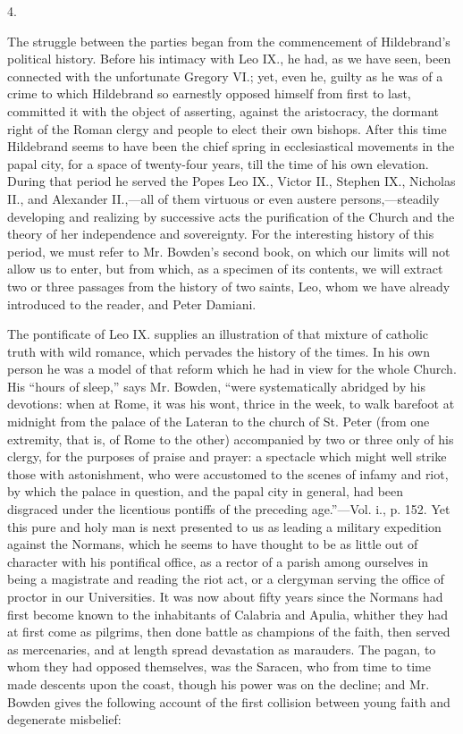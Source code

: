 4.

The struggle between the parties began from the
commencement of Hildebrand's political history. Before his intimacy
with Leo IX., he had, as we have seen, been connected with the
unfortunate Gregory VI.; yet, even he, guilty as he was of a crime to
which Hildebrand so earnestly opposed himself from first to last,
committed it with the object of asserting, against the aristocracy,
the dormant right of the Roman clergy and people to elect their own
bishops. After this time Hildebrand seems to have been the chief
spring in ecclesiastical movements in the papal city, for a space of
twenty-four years, till the time of his own elevation. During that
period he served the Popes Leo IX., Victor II., Stephen IX., Nicholas
II., and Alexander II.,—all of them virtuous or even austere
persons,—steadily developing and realizing by successive acts the
purification of the Church and the theory of her independence and
sovereignty. For the interesting history of this period, we must
refer to Mr. Bowden's second book, on which our limits will not allow
us to enter, but from which, as a specimen of its contents, we will
extract two or three passages from the history of two saints, Leo,
whom we have already introduced to the reader, and Peter Damiani.

The pontificate of Leo IX. supplies an
illustration of that mixture of catholic truth with wild romance,
which pervades the history of the times. In his own person he was a
model of that reform which he had in view for the whole Church. His ``hours
of sleep,'' says Mr. Bowden, ``were systematically abridged by his
devotions: when at Rome, it was his wont, thrice in the week, to walk
barefoot at midnight from the palace of the Lateran to the church of
St. Peter (from one extremity, that is, of Rome to the other)
accompanied by two or three only of his clergy, for the purposes of
praise and prayer: a spectacle which might well strike those with
astonishment, who were accustomed to the scenes of infamy and riot, by
which the palace in question, and the papal city in general, had been
disgraced under the licentious pontiffs of the preceding age.''—Vol.
i., p. 152. Yet this pure and holy man is next presented to us as
leading a military expedition against the Normans, which he seems to
have thought to be as little out of character with his pontifical
office, as a rector of a parish among ourselves in being a magistrate
and reading the riot act, or a clergyman serving the office of proctor
in our Universities. It was now about fifty years since the Normans
had first become known to the inhabitants of Calabria and Apulia,
whither they had at first come as pilgrims, then done battle as
champions of the faith, then served as mercenaries, and at length
spread devastation as marauders. The pagan, to whom they had opposed
themselves, was the Saracen, who from time to time made descents
upon the coast, though his power was on the decline; and Mr. Bowden
gives the following account of the first collision between young faith
and degenerate misbelief:


